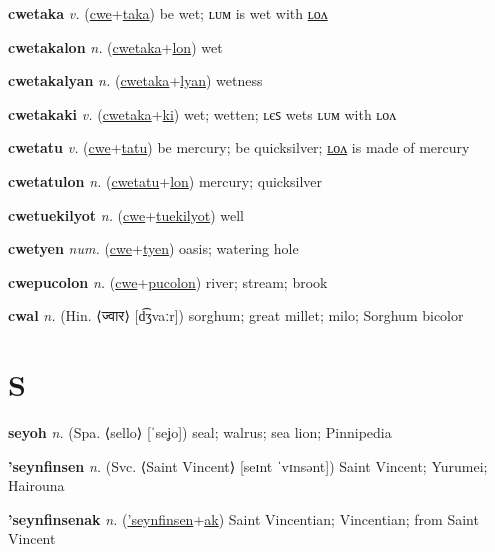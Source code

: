 \textbf{\hypertarget{cwetaka}{cwetaka}} \textit{v.} (\hyperlink{cwe}{cwe}+\allowbreak \hyperlink{taka}{taka})
be wet; ʟᴜᴍ is wet with \hyperlink{cwetakalon}{ʟᴏᴧ}

\textbf{\hypertarget{cwetakalon}{cwetakalon}} \textit{n.} (\hyperlink{cwetaka}{cwetaka}+\allowbreak \hyperlink{lon}{lon})
wet

\textbf{\hypertarget{cwetakalyan}{cwetakalyan}} \textit{n.} (\hyperlink{cwetaka}{cwetaka}+\allowbreak \hyperlink{lyan}{lyan})
wetness

\textbf{\hypertarget{cwetakaki}{cwetakaki}} \textit{v.} (\hyperlink{cwetaka}{cwetaka}+\allowbreak \hyperlink{ki}{ki})
wet; wetten; ʟєꜱ wets ʟᴜᴍ with ʟᴏᴧ

\textbf{\hypertarget{cwetatu}{cwetatu}} \textit{v.} (\hyperlink{cwe}{cwe}+\allowbreak \hyperlink{tatu}{tatu})
be mercury; be quicksilver; \hyperlink{cwetatulon}{ʟᴏᴧ} is made of mercury

\textbf{\hypertarget{cwetatulon}{cwetatulon}} \textit{n.} (\hyperlink{cwetatu}{cwetatu}+\allowbreak \hyperlink{lon}{lon})
mercury; quicksilver

\textbf{\hypertarget{cwetuekilyot}{cwetuekilyot}} \textit{n.} (\hyperlink{cwe}{cwe}+\allowbreak \hyperlink{tuekilyot}{tuekilyot})
well

\textbf{\hypertarget{cwetyen}{cwetyen}} \textit{num.} (\hyperlink{cwe}{cwe}+\allowbreak \hyperlink{tyen}{tyen})
oasis; watering hole

\textbf{\hypertarget{cwepucolon}{cwepucolon}} \textit{n.} (\hyperlink{cwe}{cwe}+\allowbreak \hyperlink{pucolon}{pucolon})
river; stream; brook

\textbf{\hypertarget{cwal}{cwal}} \textit{n.} (Hin. ⟨{\devanagari{}ज्वार}⟩ [d͡ʒvaːr])
sorghum; great millet; milo; Sorghum bicolor

\section{S}

\textbf{\hypertarget{seyoh}{seyoh}} \textit{n.} (Spa. ⟨sello⟩ [ˈseʝo])
seal; walrus; sea lion; Pinnipedia

\textbf{\hypertarget{'seynfinsen}{'seynfinsen}} \textit{n.} (Svc. ⟨Saint Vincent⟩ [seɪnt ˈvɪnsənt])
Saint Vincent; Yurumei; Hairouna

\textbf{\hypertarget{'seynfinsenak}{'seynfinsenak}} \textit{n.} (\hyperlink{'seynfinsen}{'seynfinsen}+\allowbreak \hyperlink{ak}{ak})
Saint Vincentian; Vincentian; from Saint Vincent

